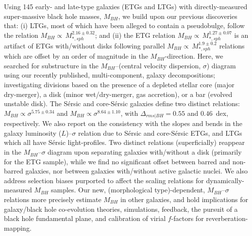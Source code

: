 


Using 145 early- and late-type galaxies (ETGs and LTGs) with directly-measured super-massive black hole masses, $M_{BH}$, we build upon our previous discoveries that: (i) LTGs, most of which have been alleged to contain a pseudobulge, follow the relation 
$M_{BH}\propto\,M_{*,sph}^{2.16\pm0.32}$; and (ii) the ETG relation $M_{BH}\propto\,M_{*,sph}^{1.27\pm0.07}$ is an artifact of ETGs with/without disks following parallel $M_{BH}\propto\,M_{*,sph}^{1.9\pm0.2}$ relations which are offset by an order of
magnitude in the $M_{BH}$-direction. Here, we searched for substructure in the $M_{BH}$--(central velocity dispersion, $\sigma$)
diagram using our recently published, multi-component, galaxy decompositions; investigating divisions based on the presence of a
depleted stellar core (major dry-merger), a disk (minor wet/dry-merger, gas accretion), or a bar (evolved unstable disk). 
The S\'ersic and core-S\'ersic galaxies define two distinct relations: $M_{BH}\propto\sigma^{5.75\pm0.34}$ and $M_{BH}\propto\sigma^{8.64\pm1.10}$, with $\Delta_{rms|BH}=0.55$ and $0.46$~dex, respectively.  We also report on the consistency with the
slopes and bends in the galaxy luminosity ($L$)--$\sigma$ relation due to S\'ersic and core-S\'ersic ETGs, and
LTGs which all have S\'ersic light-profiles.  Two distinct relations (superficially) reappear in the $M_{BH}$--$\sigma$ diagram upon separating
galaxies with/without a disk (primarily for the ETG sample), while we find no significant offset between barred and non-barred galaxies, nor between galaxies with/without active galactic nuclei. We also address selection biases purported to affect the scaling relations for dynamically-measured $M_{BH}$ samples.  Our new, (morphological type)-dependent, $M_{BH}$--$\sigma$ relations more precisely estimate $M_{BH}$ in other galaxies, and hold implications for galaxy/black hole co-evolution theories, simulations, feedback, the pursuit of a black hole fundamental plane, and calibration of virial $f$-factors for reverberation-mapping.

